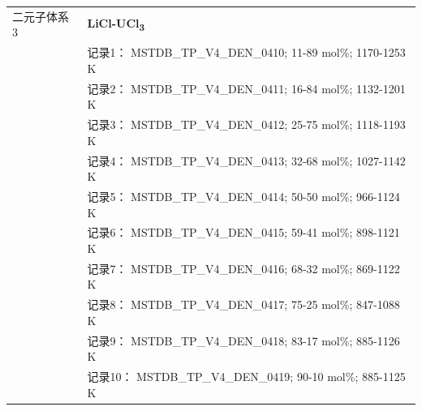 \documentclass[12pt]{article}
\begin{document}
{\begin{longtable}[]{@{}
  >{\raggedright\arraybackslash}p{}
  >{\raggedright\arraybackslash}p{}@{}}
二元子体系 3  & \textbf{LiCl-UCl\textsubscript{3}} \\
 & 记录1： MSTDB\_TP\_V4\_DEN\_0410; 11-89 mol\%; 1170-1253 K \\
 & 记录2： MSTDB\_TP\_V4\_DEN\_0411; 16-84 mol\%; 1132-1201 K \\
 & 记录3： MSTDB\_TP\_V4\_DEN\_0412; 25-75 mol\%; 1118-1193 K \\
 & 记录4： MSTDB\_TP\_V4\_DEN\_0413; 32-68 mol\%; 1027-1142 K \\
 & 记录5： MSTDB\_TP\_V4\_DEN\_0414; 50-50 mol\%; 966-1124 K \\
 & 记录6： MSTDB\_TP\_V4\_DEN\_0415; 59-41 mol\%; 898-1121 K \\
 & 记录7： MSTDB\_TP\_V4\_DEN\_0416; 68-32 mol\%; 869-1122 K \\
 & 记录8： MSTDB\_TP\_V4\_DEN\_0417; 75-25 mol\%; 847-1088 K \\
 & 记录9： MSTDB\_TP\_V4\_DEN\_0418; 83-17 mol\%; 885-1126 K \\
 & 记录10： MSTDB\_TP\_V4\_DEN\_0419; 90-10 mol\%; 885-1125 K  \\


\end{longtable}}
\end{document}
